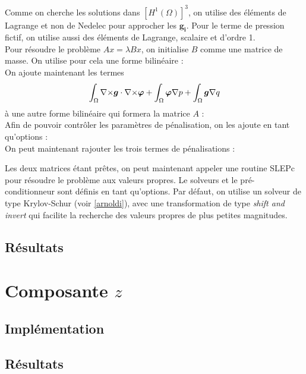 Comme on cherche les solutions dans $[H^1(\Omega)]^3$, on utilise des éléments de Lagrange et non de Nedelec pour approcher les $\bm{g_i}$. Pour le terme de pression fictif, on utilise aussi des éléments de Lagrange, scalaire et d'ordre 1.\\ 

Pour résoudre le problème $Ax=\lambda Bx$, on initialise $B$ comme une matrice de masse. On utilise pour cela une forme bilinéaire :\\

On ajoute maintenant les termes 
\[ \int_\Omega {\nabla\times} \bm{g}\cdot{\nabla\times}\bm{\varphi} + \int_\Omega\bm{\varphi}{\nabla} p + \int_\Omega \bm{g}{\nabla} q \]
à une autre forme bilinéaire qui formera la matrice $A$ :\\

Afin de pouvoir contrôler les paramètres de pénalisation, on les ajoute en tant qu'options :\\

On peut maintenant rajouter les trois termes de pénalisations :

Les deux matrices étant prêtes, on peut maintenant appeler une routine SLEPc pour résoudre le problème aux valeurs propres. Le solveurs et le pré-conditionneur sont définis en tant qu'options. Par défaut, on utilise un solveur de type Krylov-Schur (voir \ref{arnoldi}), avec une transformation de type \emph{shift and invert} qui facilite la recherche des valeurs propres de plus petites magnitudes.\\



\subsection{Résultats}

\section{Composante $z$}
\subsection{Implémentation}
\subsection{Résultats}

